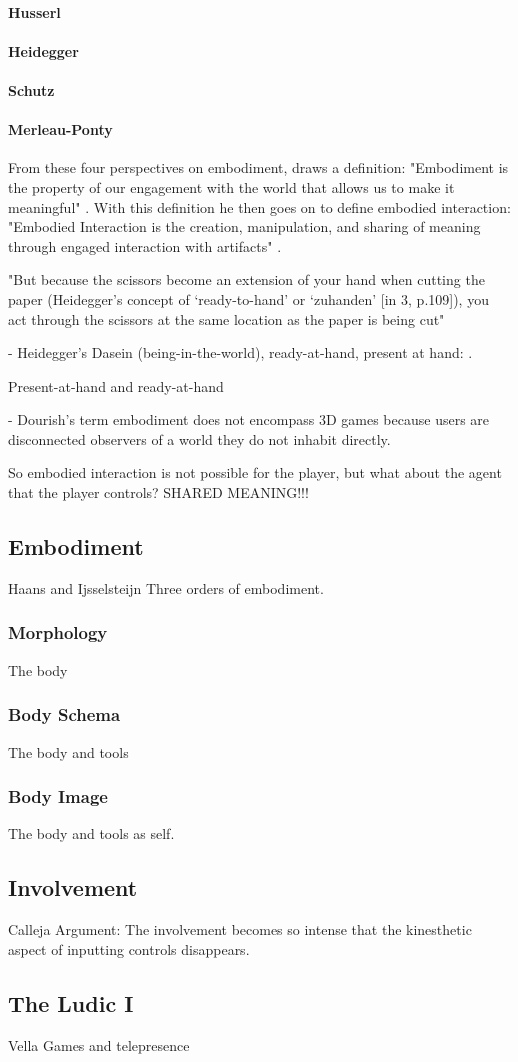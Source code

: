 \paragraph{Husserl}
\paragraph{Heidegger}
\paragraph{Schutz}
\paragraph{Merleau-Ponty}

From these four perspectives on embodiment,  draws a definition: "Embodiment is the property of our engagement with the world that allows us to make it meaningful" \cite[p. 126]{dourish}. With this definition he then goes on to define embodied interaction: "Embodied Interaction is the creation, manipulation, and sharing of meaning through engaged interaction with artifacts" \cite[p. 126]{dourish}.

"But because the scissors become an extension of your hand when cutting the paper (Heidegger’s concept of ‘ready-to-hand’ or ‘zuhanden’ [in 3, p.109]), you act through the scissors at the same location as the paper is being cut" \cite[p. 2]{frogger}

- Heidegger's Dasein (being-in-the-world), ready-at-hand, present at hand: .

Present-at-hand and ready-at-hand

- Dourish's term embodiment does not encompass 3D games because users are disconnected observers of a world they do not inhabit directly.

So embodied interaction is not possible for the player, but what about the agent that the player controls? SHARED MEANING!!!

\subsection{Embodiment}
Haans and Ijsselsteijn
Three orders of embodiment.
\subsubsection{Morphology}
The body
\subsubsection{Body Schema}
The body and tools
\subsubsection{Body Image}
The body and tools as self.


\subsection{Involvement}
Calleja
Argument: The involvement becomes so intense that the kinesthetic aspect of inputting controls disappears.

\subsection{The Ludic I}
Vella
Games and telepresence
